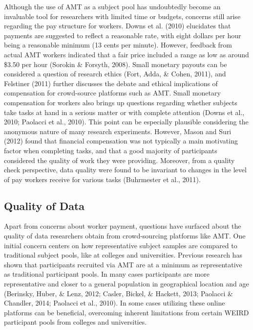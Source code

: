 \documentclass[english,man]{apa6}
\theoremstyle{definition}
\theoremstyle{definition}
\theoremstyle{definition}
\theoremstyle{remark}
\begin{document}
Although the use of AMT as a subject pool has undoubtedly become an
invaluable tool for researchers with limited time or budgets, concerns
still arise regarding the pay structure for workers. Downs et al. (2010)
elucidates that payments are suggested to reflect a reasonable rate,
with eight dollars per hour being a reasonable minimum (13 cents per
minute). However, feedback from actual AMT workers indicated that a fair
price included a range as low as around \$3.50 per hour (Sorokin \&
Forsyth, 2008). Small monetary payouts can be considered a question of
research ethics (Fort, Adda, \& Cohen, 2011), and Felstiner (2011)
further discusses the debate and ethical implications of compensation
for crowd-source platforms such as AMT. Small monetary compensation for
workers also brings up questions regarding whether subjects take tasks
at hand in a serious matter or with complete attention (Downs et al.,
2010; Paolacci et al., 2010). This point can be especially plausible
considering the anonymous nature of many research experiments. However,
Mason and Suri (2012) found that financial compensation was not
typically a main motivating factor when completing tasks, and that a
good majority of participants considered the quality of work they were
providing. Moreover, from a quality check perspective, data quality were
found to be invariant to changes in the level of pay workers receive for
various tasks (Buhrmester et al., 2011).

\subsection{Quality of Data}\label{quality-of-data}

Apart from concerns about worker payment, questions have surfaced about
the quality of data researchers obtain from crowd-sourcing platforms
like AMT. One initial concern centers on how representative subject
samples are compared to traditional subject pools, like at colleges and
universities. Previous research has shown that participants recruited
via AMT are at a minimum as representative as traditional participant
pools. In many cases participants are more representative and closer to
a general population in geographical location and age (Berinsky, Huber,
\& Lenz, 2012; Casler, Bickel, \& Hackett, 2013; Paolacci \& Chandler,
2014; Paolacci et al., 2010). In some cases utilizing these online
platforms can be beneficial, overcoming inherent limitations from
certain WEIRD participant pools from colleges and universities.
\end{document}
